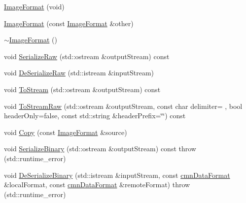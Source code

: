 \begin{DoxyCompactItemize}
\item 
\hyperlink{classsvl_filter_source_video_capture_types_1_1_image_format_ad09aa5e85464b4721e083c80fb309d9d}{Image\+Format} (void)
\item 
\hyperlink{classsvl_filter_source_video_capture_types_1_1_image_format_afc3363d068b9f2a5ae39794b66453f44}{Image\+Format} (const \hyperlink{classsvl_filter_source_video_capture_types_1_1_image_format}{Image\+Format} \&other)
\item 
\hyperlink{classsvl_filter_source_video_capture_types_1_1_image_format_a1a6dfaefb3838e1c63aa950ceee54138}{$\sim$\+Image\+Format} ()
\item 
void \hyperlink{classsvl_filter_source_video_capture_types_1_1_image_format_a8e5d7d3bddd7faeffdea2a4c700c2ae3}{Serialize\+Raw} (std\+::ostream \&output\+Stream) const 
\item 
void \hyperlink{classsvl_filter_source_video_capture_types_1_1_image_format_a22c39a8837ef03908ed5c4c8ebc5d374}{De\+Serialize\+Raw} (std\+::istream \&input\+Stream)
\item 
void \hyperlink{classsvl_filter_source_video_capture_types_1_1_image_format_a4fd41abc52537412f26f06762f680a33}{To\+Stream} (std\+::ostream \&output\+Stream) const 
\item 
void \hyperlink{classsvl_filter_source_video_capture_types_1_1_image_format_a516e93bf9a3668002888d49992cd55af}{To\+Stream\+Raw} (std\+::ostream \&output\+Stream, const char delimiter= \textquotesingle{} \textquotesingle{}, bool header\+Only=false, const std\+::string \&header\+Prefix=\char`\"{}\char`\"{}) const 
\item 
void \hyperlink{classsvl_filter_source_video_capture_types_1_1_image_format_a1f4f70055deccf48e610b642f6ce3019}{Copy} (const \hyperlink{classsvl_filter_source_video_capture_types_1_1_image_format}{Image\+Format} \&source)
\item 
void \hyperlink{classsvl_filter_source_video_capture_types_1_1_image_format_a68602d2348cca441cbc7a78464bf99d0}{Serialize\+Binary} (std\+::ostream \&output\+Stream) const   throw (std\+::runtime\+\_\+error)
\item 
void \hyperlink{classsvl_filter_source_video_capture_types_1_1_image_format_ad399aa52c8bf24bcf03da4c48749d156}{De\+Serialize\+Binary} (std\+::istream \&input\+Stream, const \hyperlink{classcmn_data_format}{cmn\+Data\+Format} \&local\+Format, const \hyperlink{classcmn_data_format}{cmn\+Data\+Format} \&remote\+Format)  throw (std\+::runtime\+\_\+error)

\end{DoxyCompactItemize}
